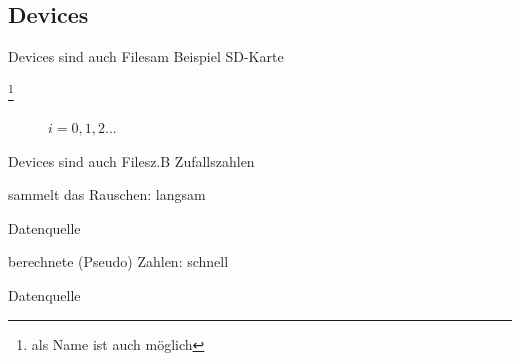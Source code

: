 \documentclass{beamer}
\begin{document}
\subsection{Devices}
\begin{frame}{Devices sind auch Files}{am Beispiel SD-Karte}
 \begin{description}
  \item[\footnote{als Name ist auch  möglich}] $i=0,1,2 ...$
 \end{description}
\end{frame}

\begin{frame}{Devices sind auch Files}{z.B Zufallszahlen}
 \begin{description}
  \item[\cod{/dev/random}] sammelt das Rauschen: langsam
  \begin{description}
   \item[Datenquelle] 
  \end{description}
  \item[\cod{/dev/urandom}] berechnete (Pseudo) Zahlen: schnell
  \begin{description}
   \item[Datenquelle]
  \end{description}
 \end{description}
\end{frame}
\end{document}
